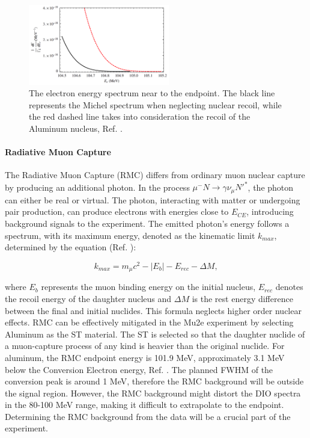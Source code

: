 \begin{figure}[!h]
\centering
\includegraphics[width =0.55\textwidth]{figures/png/Screenshot_20240222_175644.png}
\caption[The electron energy spectrum near to the endpoint.]{The electron energy spectrum near to the endpoint. The black line 
represents the Michel spectrum when neglecting nuclear recoil, while the red 
dashed line takes into consideration the recoil of the Aluminum nucleus, Ref. 
\cite{PhysRevD.84.013006}.}
\label{fig:micheldiff}
\end{figure}
\paragraph{Radiative Muon Capture}

The Radiative Muon Capture (RMC) differs from ordinary muon nuclear capture by 
producing an additional photon. In the process $\mu^- N \rightarrow\gamma \nu_\mu N'^* $, 
the photon can either be real or virtual. The photon, interacting with matter or 
undergoing pair production, can produce electrons with energies close to $E_{CE}$, 
introducing background signals to the experiment. The emitted photon's energy follows 
a spectrum, with its maximum energy, denoted as the kinematic limit $k_{max}$, 
determined by the equation (Ref. \cite{bartoszek2015mu2e}):

\begin{equation}
k_{max} = m_\mu c^2 - |E_b| - E_{rec} - \Delta M ,
\end{equation}

where $E_b$ represents the muon binding energy on the initial nucleus, $E_{rec}$ denotes 
the recoil energy of the daughter nucleus and $\Delta M$ is the rest energy difference 
between the final and initial nuclides. This formula neglects higher order nuclear effects. 
RMC can be effectively mitigated in the Mu2e experiment by selecting Aluminum as the ST material. The ST is selected so that the daughter nuclide of a muon-capture 
process of any kind is heavier than the original nuclide. For aluminum, the RMC endpoint energy 
is 101.9 MeV, approximately 3.1 MeV below the Conversion Electron energy, Ref. 
\cite{bartoszek2015mu2e}. 
The planned FWHM of the conversion peak is around 1 MeV, therefore the RMC background will be 
outside the signal region. However, the RMC background might distort the DIO spectra 
in the 80-100 MeV 
range, making it difficult to extrapolate to the endpoint. Determining the RMC 
background from the data will be a crucial part of the experiment.
